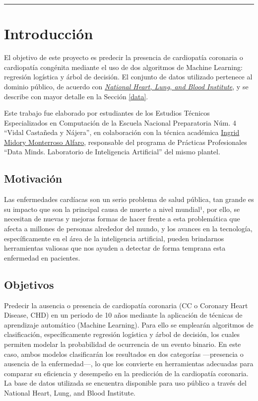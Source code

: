 \documentclass{article}
\begin{document}
    \begin{center}
		\textcolor{teal}{\rule{150mm}{0.5mm}}
    \end{center}	

\section{Introducción}

El objetivo de este proyecto es predecir la presencia de cardiopatía coronaria o cardiopatía congénita mediante el uso de dos algoritmos de Machine Learning: regresión logística y árbol de decisión.
El conjunto de datos utilizado pertenece al dominio público, de acuerdo con \href{https://biolincc.nhlbi.nih.gov/teaching/}{\textit{National Heart, Lung, and Blood Institute}}, y se describe con mayor detalle en la Sección \ref{data}.

Este trabajo fue elaborado por estudiantes de los Estudios Técnicos Especializados en Computación de la Escuela Nacional Preparatoria Núm. 4 “Vidal Castañeda y Nájera”, en colaboración con la técnica académica \href{https://github.com/ingridmidory}{Ingrid Midory Monterroso Alfaro}, responsable del programa de Prácticas Profesionales “Data Minds. Laboratorio de Inteligencia Artificial” del mismo plantel.


    \subsection{Motivación}

    Las enfermedades cardíacas son un serio problema de salud pública, tan grande es su impacto que son la principal causa de muerte a nivel mundial¹, por ello, se necesitan de nuevas y mejoras formas de hacer frente a esta problemática que afecta a millones de personas alrededor del mundo, y los avances en la tecnología, específicamente en el área de la inteligencia artificial, pueden brindarnos herramientas valiosas que nos ayuden a detectar de forma temprana esta enfermedad en pacientes.

    \subsection{Objetivos}

    Predecir la ausencia o presencia de cardiopatía coronaria (CC o Coronary Heart Disease, CHD) en un periodo de 10 años mediante la aplicación de técnicas de aprendizaje automático (Machine Learning). Para ello se emplearán algoritmos de clasificación, específicamente regresión logística y árbol de decisión, los cuales permiten modelar la probabilidad de ocurrencia de un evento binario. En este caso, ambos modelos clasificarán los resultados en dos categorías —presencia o ausencia de la enfermedad—, lo que los convierte en herramientas adecuadas para comparar su eficiencia y desempeño en la predicción de la cardiopatía coronaria. La base de datos utilizada se encuentra disponible para uso público a través del National Heart, Lung, and Blood Institute.      
\end{document}
